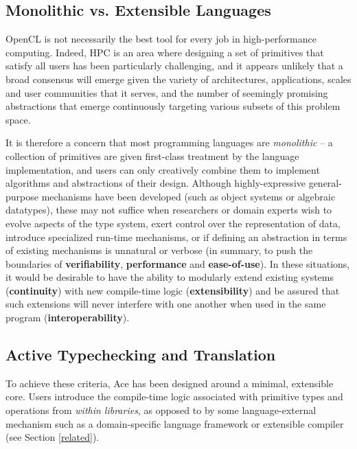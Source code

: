 \documentclass[9pt,preprint]{sigplanconf}
\begin{document}
\subsection{Monolithic vs. Extensible Languages}
OpenCL is not necessarily the best tool for every job in high-performance computing. Indeed, HPC is an area where designing a set of primitives that satisfy all users has been particularly challenging, and it appears unlikely that a broad consensus will emerge given the variety of architectures, applications, scales and user communities that it serves, and the number of seemingly promising abstractions that emerge continuously targeting various subsets of this problem space.

It is therefore a concern that most programming languages are {\em monolithic} -- a collection of primitives are given first-class treatment by the language implementation, and users can only creatively combine them to implement algorithms and abstractions of their design. Although highly-expressive general-purpose mechanisms have been developed (such as object systems or algebraic datatypes), these may not suffice when researchers or domain experts wish to evolve aspects of the type system, exert control over the representation of data, introduce specialized run-time mechanisms, or if defining an abstraction in terms of existing mechanisms is unnatural or verbose (in summary, to push the boundaries of \textbf{verifiability}, \textbf{performance} and \textbf{ease-of-use}). In these situations, it would be desirable to have the ability to modularly extend existing systems (\textbf{continuity}) with new compile-time logic (\textbf{extensibility}) and be assured that such extensions will never interfere with one another when used in the same program (\textbf{interoperability}).

\subsection{Active Typechecking and Translation}
To achieve these criteria, Ace has been designed around a minimal, {extensible} core. Users introduce the compile-time logic associated with primitive types and operations from \emph{within libraries}, as opposed to by some language-external mechanism such as a domain-specific language framework or extensible compiler (see Section \ref{related}). 
\end{document}
